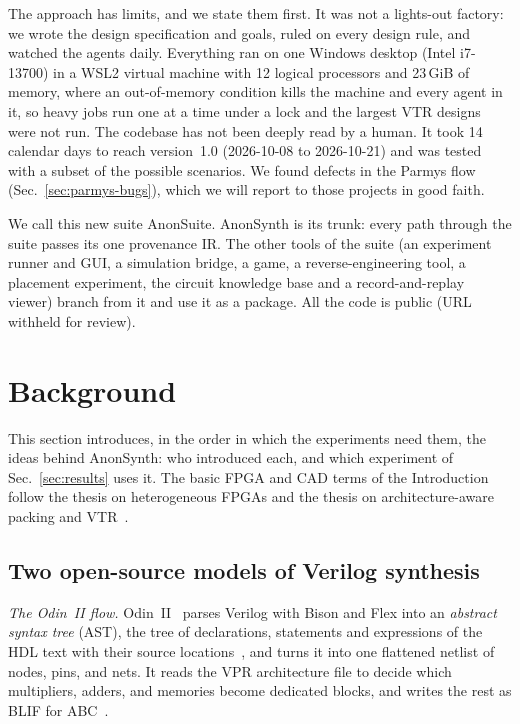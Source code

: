 \documentclass[conference]{IEEEtran}
\begin{document}
The approach has limits, and we state them first. It was not a lights-out factory: we wrote the design specification and goals, ruled on every design rule, and watched the agents daily. Everything ran on one Windows desktop (Intel i7-13700) in a WSL2 virtual machine with 12 logical processors and 23\,GiB of memory, where an out-of-memory condition kills the machine and every agent in it, so heavy jobs run one at a time under a lock and the largest VTR designs were not run. The codebase has not been deeply read by a human. It took 14 calendar days to reach version~1.0 (2026-10-08 to 2026-10-21) and was tested with a subset of the possible scenarios. We found defects in the Parmys flow (Sec.~\ref{sec:parmys-bugs}), which we will report to those projects in good faith.

We call this new suite AnonSuite. AnonSynth is its trunk: every path through the suite passes its one provenance IR. The other tools of the suite (an experiment runner and GUI, a simulation bridge, a game, a reverse-engineering tool, a placement experiment, the circuit knowledge base and a record-and-replay viewer) branch from it and use it as a package. All the code is public (URL withheld for review).


\section{Background}
\label{sec:background}

This section introduces, in the order in which the experiments need them, the ideas behind AnonSynth: who introduced each, and which experiment of Sec.~\ref{sec:results} uses it. The basic FPGA and CAD terms of the Introduction follow the thesis on heterogeneous FPGAs and the thesis on architecture-aware packing and VTR~\cite{luuthesis}.

\subsection{Two open-source models of Verilog synthesis}

\emph{The Odin~II flow.} Odin~II~\cite{anon10} parses Verilog with Bison and Flex into an \emph{abstract syntax tree} (AST), the tree of declarations, statements and expressions of the HDL text with their source locations~\cite{ast}, %
and turns it into one flattened netlist of nodes, pins, and nets. It reads the VPR architecture file to decide which multipliers, adders, and memories become dedicated blocks, and writes the rest as BLIF for ABC~\cite{brayton2010abc}.
\end{document}
